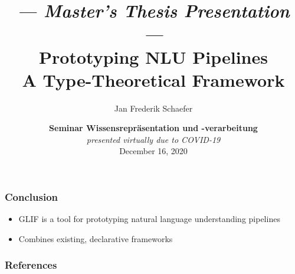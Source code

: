\documentclass[aspectratio=169]{beamer}
\title{{\footnotesize\itshape --- Master's Thesis Presentation ---}\\[1pt] Prototyping NLU Pipelines\\[3pt] \normalsize A Type-Theoretical Framework}
\author{Jan Frederik Schaefer}
\institute{FAU Erlangen-N\"urnberg}
\date{\textbf{Seminar Wissensrepr\"asentation und -verarbeitung} \\ \textit{presented virtually due to COVID-19} \\ December 16, 2020 }
\begin{document}
\frame\titlepage
















\begin{frame}
    \frametitle{Conclusion}
    \begin{itemize}
        \item GLIF is a tool for prototyping natural language understanding pipelines
        \item Combines existing, declarative frameworks
    \end{itemize}

    \vspace{2em}
    
\end{frame}

\appendix

\begin{frame}[allowframebreaks,t]
    \frametitle{References}
    \printbibliography
\end{frame}
\end{document}
